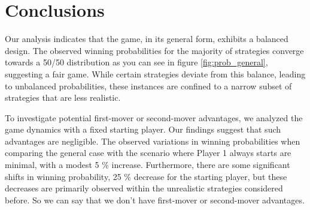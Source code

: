 \section{Conclusions} \label{section:Conclusions} %
Our analysis indicates that the game, in its general form, exhibits a balanced design. The observed winning probabilities for the majority of strategies converge towards a 50/50 distribution as you can see in figure \ref{fig:prob_general}, suggesting a fair game. While certain strategies deviate from this balance, leading to unbalanced probabilities, these instances are confined to a narrow subset of strategies that are less realistic.

To investigate potential first-mover or second-mover advantages, we analyzed the game dynamics with a fixed starting player. Our findings suggest that such advantages are negligible. The observed variations in winning probabilities when comparing the general case with the scenario where Player 1 always starts are minimal, with a modest 5 \% increase. Furthermore, there are some significant shifts in winning probability, 25 \% decrease for the starting player, but these decreases are primarily observed within the unrealistic strategies considered before. So we can say that we don't have first-mover or second-mover advantages.
